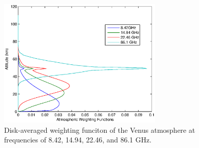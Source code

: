 \begin{figure}[p]
    \centering
	\includegraphics[width=0.7\textwidth]{./rtm/plots/weight.eps}
	\caption{Disk-averaged weighting funciton of the Venus atmosphere at frequencies of 8.42, 14.94, 22.46, and 86.1 GHz. }
		\label{fig:weight}
\end{figure}